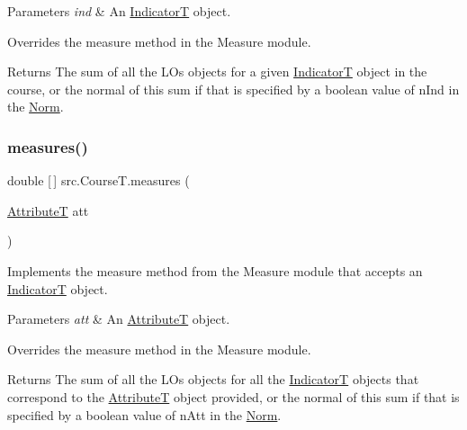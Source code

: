 \begin{DoxyParams}{Parameters}
{\em ind} & An \hyperlink{enumsrc_1_1IndicatorT}{IndicatorT} object.\\
\hline
\end{DoxyParams}
Overrides the measure method in the Measure module.

\begin{DoxyReturn}{Returns}
The sum of all the L\+Os objects for a given \hyperlink{enumsrc_1_1IndicatorT}{IndicatorT} object in the course, or the normal of this sum if that is specified by a boolean value of n\+Ind in the \hyperlink{classsrc_1_1Norm}{Norm}. 
\end{DoxyReturn}
\mbox{\label{classsrc_1_1CourseT_a63d2487bf823e561f12fb06299b23ecd}} 
\subsubsection{\texorpdfstring{measures()}{measures()}\hspace{0.1cm}{\footnotesize\ttfamily [3/3]}}
{\footnotesize\ttfamily double \mbox{[}$\,$\mbox{]} src.\+Course\+T.\+measures (\begin{DoxyParamCaption}\item[{\hyperlink{classsrc_1_1AttributeT}{AttributeT}}]{att }\end{DoxyParamCaption})}



Implements the measure method from the Measure module that accepts an \hyperlink{enumsrc_1_1IndicatorT}{IndicatorT} object. 


\begin{DoxyParams}{Parameters}
{\em att} & An \hyperlink{classsrc_1_1AttributeT}{AttributeT} object.\\
\hline
\end{DoxyParams}
Overrides the measure method in the Measure module. \begin{DoxyReturn}{Returns}
The sum of all the L\+Os objects for all the \hyperlink{enumsrc_1_1IndicatorT}{IndicatorT} objects that correspond to the \hyperlink{classsrc_1_1AttributeT}{AttributeT} object provided, or the normal of this sum if that is specified by a boolean value of n\+Att in the \hyperlink{classsrc_1_1Norm}{Norm}. 
\end{DoxyReturn}
\mbox{\label{classsrc_1_1CourseT_a98d560017671e680b42c9d781eb9bb5a}} 
